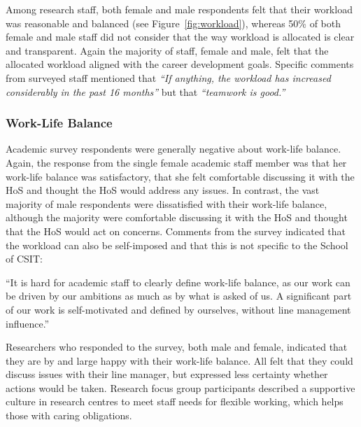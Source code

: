 Among research staff, both female and male respondents felt that their workload was reasonable and balanced (see Figure~\ref{fig:workload}), whereas 50\% of both female and male staff did not consider that the way workload is allocated is clear and transparent. Again the majority of staff, female and male, felt that the allocated workload aligned with the career development goals. Specific comments from surveyed staff mentioned that \textit{“If anything, the workload has increased considerably in the past 16 months”} but that \textit{“teamwork is good.”}


\subsubsection{Work-Life Balance}

Academic survey respondents were generally negative about work-life balance. Again, the response from the single female academic staff member was that her work-life balance was satisfactory, that she felt comfortable discussing it with the HoS and thought the HoS would address any issues. In contrast, the vast majority of male respondents were dissatisfied with their work-life balance, although the majority were comfortable discussing it with the HoS and thought that the HoS would act on concerns. Comments from the survey indicated that the workload can also be self-imposed and that this is not specific to the School of CSIT:

\begin{myquote}
``It is hard for academic staff to clearly define work-life balance, as our work can be driven by our ambitions as much as by what is asked of us. A significant part of our work is self-motivated and defined by ourselves, without line management influence.''
\end{myquote}


Researchers who responded to the survey, both male and female, indicated that they are by and large happy with their work-life balance. All felt that they could discuss issues with their line manager, but expressed less certainty whether actions would be taken. Research focus group participants described a supportive culture in research centres to meet staff needs for flexible working, which helps those with caring obligations. 


